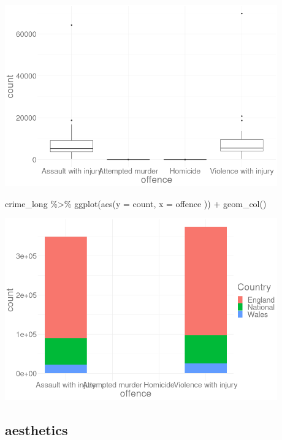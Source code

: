\documentclass[
]{book}
\newenvironment{Shaded}{\begin{snugshade}}{\end{snugshade}}
\newcommand{\AttributeTok}[1]{\textcolor[rgb]{0.77,0.63,0.00}{#1}}
\newcommand{\FunctionTok}[1]{\textcolor[rgb]{0.00,0.00,0.00}{#1}}
\newcommand{\NormalTok}[1]{#1}
\newcommand{\SpecialCharTok}[1]{\textcolor[rgb]{0.00,0.00,0.00}{#1}}
\begin{document}
\begin{center}\includegraphics[width=333.333333333333pt]{imgs/pts5} \end{center}

\begin{Shaded}
\begin{Highlighting}[]
\NormalTok{crime\_long }\SpecialCharTok{\%\textgreater{}\%}
  \FunctionTok{ggplot}\NormalTok{(}\FunctionTok{aes}\NormalTok{(}\AttributeTok{y =}\NormalTok{ count,}
             \AttributeTok{x =}\NormalTok{ offence}
\NormalTok{             )) }\SpecialCharTok{+}
  \FunctionTok{geom\_col}\NormalTok{()}
\end{Highlighting}
\end{Shaded}

\begin{center}\includegraphics[width=333.333333333333pt]{imgs/pts6} \end{center}

\hypertarget{aesthetics-1}{%
\subsection{aesthetics}\label{aesthetics-1}}
\end{document}
